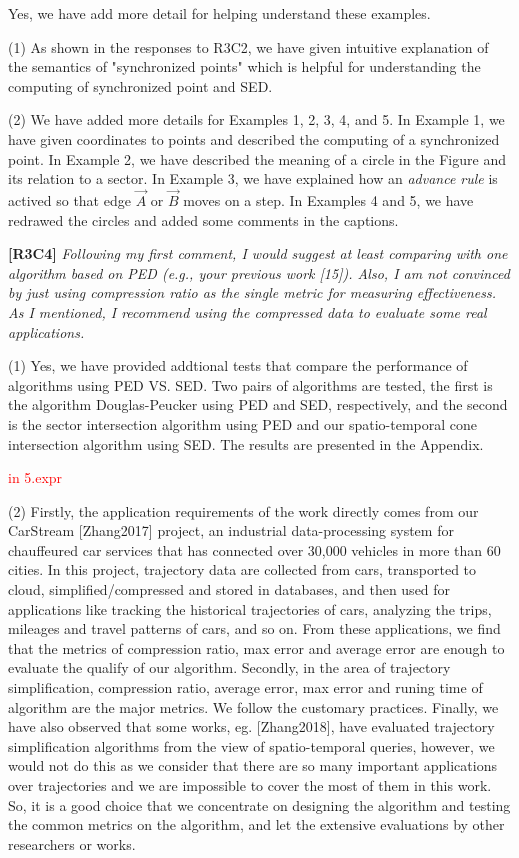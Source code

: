 \documentclass{letter}
\begin{document}
Yes, we have add more detail for helping understand these examples.

(1) As shown in the responses to R3C2, we have given intuitive explanation of the semantics of "synchronized points" which is helpful for understanding the computing of synchronized point and SED.

(2) We have added more details for Examples 1, 2, 3, 4, and 5. In Example 1, we have given coordinates to points and described the computing of a synchronized point. In Example 2, we have described the meaning of a circle in the Figure and its relation to a sector. In Example 3, we have explained how an \emph{advance rule} is actived so that edge $\overrightarrow{A}$ or $\overrightarrow{B}$ moves on a step. In Examples 4 and 5, we have redrawed the circles and added some comments in the captions.

\textbf{[R3C4]} \emph{Following my first comment, I would suggest at least comparing with one algorithm based on PED (e.g., your previous work [15]). Also, I am not convinced by just using compression ratio as the single metric for measuring effectiveness. As I mentioned, I recommend using the compressed data to evaluate some real applications.}

(1) Yes, we have provided addtional tests that compare the performance of algorithms using PED VS. SED. Two pairs of algorithms are tested, the first is the algorithm Douglas-Peucker using PED and SED, respectively, and the second is the sector intersection algorithm using PED and our spatio-temporal cone intersection algorithm using SED. %
The results are presented in the Appendix.

\textcolor{red}{in 5.expr}

(2) Firstly, the application requirements of the work directly comes from our CarStream [Zhang2017] project, an industrial data-processing system for chauffeured car services that has connected over 30,000 vehicles in more than 60 cities. In this project, trajectory data are collected from cars, transported to cloud, simplified/compressed and stored in databases, and then used for applications like tracking the historical trajectories of cars, analyzing the trips, mileages and travel patterns of cars, and so on. From these applications, we find that the metrics of compression ratio, max error and average error are enough to evaluate the qualify of our algorithm. Secondly, in the area of trajectory simplification, compression ratio, average error, max error and runing time of algorithm are the major metrics. We follow the customary practices. Finally, we have also observed that some {works}, eg. [Zhang2018], have evaluated trajectory simplification algorithms from the view of spatio-temporal queries, however, we would not do this as we consider that there are so many important applications over trajectories and we are impossible to cover the most of them in this work. So, it is a good choice that we concentrate on designing the algorithm and testing the common metrics on the  algorithm, and let the extensive evaluations by other researchers or works.
\end{document}
